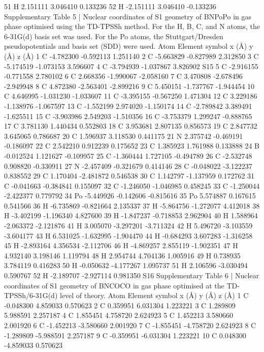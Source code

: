 51 H 2.151111 3.046410 0.133236
52 H -2.151111 3.046410 -0.133236
Supplementary Table 5 | Nuclear coordinates of S1 geometry of BNPoPo in gas phase
optimised using the TD-TPSSh method. For the H, B, C, and N atoms, the 6-31G(d) basis set
was used. For the Po atoms, the Stuttgart/Dresden pseudopotentials and basis set (SDD) were
used.
Atom Element symbol x (Å) y (Å) z (Å)
1 C -4.782300 -0.592113 1.251140
2 C -5.663829 -0.827989 2.312850
3 C -5.174519 -1.073153 3.596607
4 C -3.794939 -1.037867 3.826902
S15
5
C
-2.916155
-0.771558 2.780102
6
C 2.668356
-1.990067
-2.058160
7
C 3.470808
-2.678496
-2.949948
8
C 4.872380
-2.563401
-2.899216
9
C 5.450151
-1.737767
-1.944454
10
C 4.646995
-1.031230
-1.033607
11
C
-3.395155
-0.567250 1.471304
12
C 3.229186
-1.138976
-1.067597
13
C
-1.552199 2.974020
-1.150174
14
C
-2.789842 3.389491
-1.625511
15
C
-3.903986 2.549203
-1.510356
16
C
-3.753379 1.299247
-0.888765
17
C 3.781130 1.440434 0.552803
18
C 3.953681 2.807135 0.856573
19
C 2.847732 3.645065 0.786687
20
C 1.596937 3.118530 0.441175
21
N 2.375742
-0.469191
-0.186097
22
C 2.542210 0.912239 0.175652
23
C 1.385923 1.761988 0.133888
24
B
-0.012524 1.121627
-0.109957
25
C
-1.360444 1.727105
-0.494789
26
C
-2.532748 0.908820
-0.330911
27
N
-2.457409
-0.321679 0.414146
28
C
-0.048022
-3.122237 0.838552
29
C 1.170404
-2.481872 0.546538
30
C 1.142797
-1.137959 0.172762
31
C
-0.041663
-0.384841 0.155097
32
C
-1.246050
-1.046985 0.458245
33
C
-1.250044
-2.422377 0.779792
34 Po
-5.449926
-0.142606
-0.815616
35 Po 5.574887 0.167615 0.541566
36
H
-6.735869
-0.821664 2.135337
37
H
-5.864756
-1.272077 4.412018
38
H
-3.402199
-1.196340 4.827600
39
H
-1.847237
-0.718853 2.962904
40
H 1.588964
-2.063372
-2.121876
41
H 3.005070
-3.297201
-3.711324
42
H 5.496720
-3.103559
-3.604177
43
H 6.531025
-1.632995
-1.904470
44
H
-0.684293 3.607283
-1.316258
45
H
-2.893164 4.356534
-2.112706
46
H
-4.869257 2.855119
-1.902351
47
H 4.932140 3.198146 1.119794
48
H 2.954744 4.704136 1.005916
49
H 0.738935 3.784119 0.416283
50
H
-0.050632
-4.177267 1.095737
51
H 2.106596
-3.030494 0.590767
52
H
-2.189707
-2.927114 0.981350
S16
Supplementary Table 6 | Nuclear coordinates of S1 geometry of BNCOCO in gas phase
optimised at the TD-TPSSh/6-31G(d) level of theory.
Atom Element symbol x (Å) y (Å) z (Å)
1 C -0.048300 4.859033 0.570623
2 C 0.359951 6.031304 1.223221
3 C 1.289809 5.988591 2.257187
4 C 1.855451 4.758720 2.624923
5 C 1.452213 3.580660 2.001920
6 C -1.452213 -3.580660 2.001920
7 C -1.855451 -4.758720 2.624923
8 C -1.289809 -5.988591 2.257187
9 C -0.359951 -6.031304 1.223221
10 C 0.048300 -4.859033 0.570623
